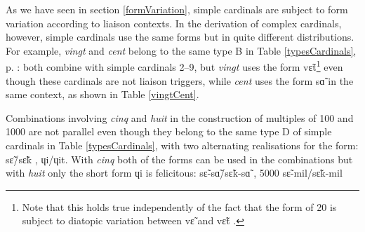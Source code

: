 \documentclass[output=paper]{langsci/langscibook}
\begin{document}
As we have seen in section \ref{formVariation},  simple cardinals  are subject to form variation according to liaison  contexts.
In the derivation of complex cardinals, however, simple cardinals  use the same forms but in quite different distributions. For example, \emph{vingt}  and \emph{cent}  belong to the same type B in Table \ref{typesCardinals}, p. \pageref{typesCardinals}: both combine with simple cardinals  2--9, but \emph{vingt} uses the \lplus{} form vɛ̃t\footnote{Note that this holds true independently of the fact that the \lpause{} form of 20 is subject to diatopic variation between vɛ̃ %
 and vɛ̃t %
.} even though these cardinals  are not liaison  triggers, while \emph{cent} uses the \lmoins{} form sɑ̃ %
 in the same context, as shown in Table \ref{vingtCent}.
\begin{table}
\caption{\emph{vingt} and \emph{cent} combinations with simple cardinals from 2 to 9}
\label{vingtCent}
\end{table}
\medskip

Combinations involving \emph{cinq}  and \emph{huit}  in the construction of multiples of 100 and 1000 are not parallel even though they belong to the same type D of simple cardinals  in Table \ref{typesCardinals}, with two alternating realisations for the \lmoins{} form: sɛ̃/sɛ̃k %
, ɥi/ɥit. %
With \emph{cinq} both of the \lmoins{} forms can be used in the combinations but with \emph{huit} only the short \lmoins{} form ɥi %
 is felicitous:
\ea
	 sɛ̃-sɑ̃/sɛ̃k-sɑ̃ %
, 5000 sɛ̃-mil/sɛ̃k-mil %
\end{document}
